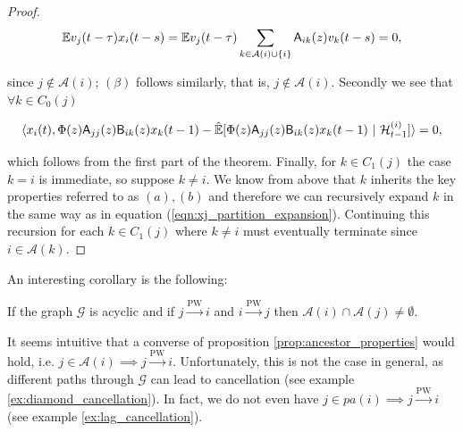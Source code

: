 \documentclass[12pt]{article}
\def\pwgc{\overset{\text{PW}}{\rightarrow}}  %
\def\gcg{\mathcal{G}}  %
\def\B{\mathsf{B}}  %
\def\A{\mathsf{A}}  %
\def\H{\mathcal{H}}  %
\newcommand{\linE}[2]{\hat{\E}[#1\ |\ #2]}  %
\newcommand{\pa}[1]{pa(#1)}  %
\newcommand{\anc}[1]{\mathcal{A}(#1)}  %
\begin{document}
\begin{proof}
  \begin{equation*}
    \E v_j(t - \tau) x_i(t - s) = \E v_j(t - \tau) \sum_{k \in \anc{i} \cup \{i\}}\A_{ik}(z)v_k(t - s) = 0,
  \end{equation*}

  since $j \not \in \anc{i}$; $(\beta)$ follows similarly, that is, $j \not \in \anc{i}$.  Secondly we see that $\forall k \in C_0(j)$

  \begin{equation*}
    \inner{x_i(t)}{\Phi(z)\A_{jj}(z)\B_{ik}(z)x_k(t - 1) - \linE{\Phi(z)\A_{jj}(z)\B_{ik}(z)x_k(t - 1)}{\H_{t - 1}^{(i)}}} = 0,
  \end{equation*}

  which follows from the first part of the theorem.  Finally, for $k \in C_1(j)$ the case $k = i$ is immediate, so suppose $k \ne i$.  We know from above that $k$ inherits the key properties referred to as $(a), (b)$ and therefore we can recursively expand $k$ in the same way as in equation (\ref{eqn:xj_partition_expansion}).  Continuing this recursion for each $k \in C_1(j)$ where $k \ne i$ must eventually terminate since $i \in \anc{k}$.
\end{proof}

An interesting corollary is the following:

\begin{corollary}
  If the graph $\gcg$ is acyclic and if $j \pwgc i$ and $i \pwgc j$ then $\anc{i} \cap \anc{j} \ne \emptyset$.
\end{corollary}

It seems intuitive that a converse of proposition \ref{prop:ancestor_properties}
would hold, i.e. $j \in \anc{i} \implies j \pwgc i$.  Unfortunately,
this is not the case in general, as different paths through $\gcg$ can
lead to cancellation (see example \ref{ex:diamond_cancellation}).  In
fact, we do not even have $j \in \pa{i} \implies j \pwgc i$ (see
example \ref{ex:lag_cancellation}).
\end{document}
